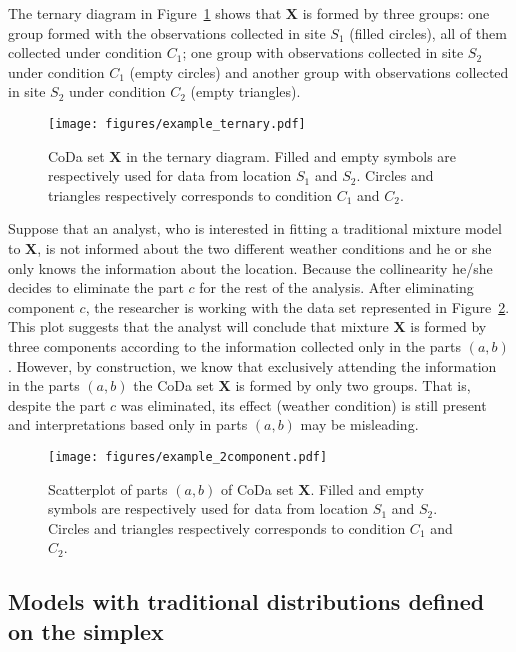 \documentclass[12pt, a4paper]{article}
\begin{document}
The ternary diagram in Figure~\ref{example_elim_component} shows that $\mathbf{X}$ is formed by three groups: one group formed with the observations collected in site $S_1$ (filled circles), all of them collected under condition $C_1$; one group with observations collected in site $S_2$ under condition $C_1$ (empty circles) and another group with observations collected in site $S_2$ under condition $C_2$ (empty triangles).
\begin{figure}[thbp]
\centering
\texttt{[image: figures/example\_ternary.pdf]}
\caption{CoDa set $\mathbf{X}$ in the ternary diagram. Filled and empty symbols are respectively used for
data from location $S_1$ and $S_2$. Circles and triangles respectively corresponds to condition
$C_1$ and $C_2$. }\label{example_elim_component}
\end{figure}
Suppose that an analyst, who is interested in fitting a traditional mixture model to $\mathbf{X}$, is not informed about the two different weather conditions and he or she only knows the information about the location. Because 
the collinearity he/she decides to eliminate the part $c$ for the rest of the analysis. After eliminating component $c$, the researcher is working with the data set represented in Figure~\ref{example_elim_2_components}. This plot suggests that the analyst will conclude that mixture $\mathbf{X}$ is formed by three components according to the information collected only in the parts $(a, b)$. However, by construction, we know that exclusively attending the information in the parts $(a, b)$ the CoDa set $\mathbf{X}$ is formed by only two groups. That is, despite the part $c$ was eliminated, its effect (weather condition) is still present and interpretations based only in parts $(a, b)$ may be misleading.
\begin{figure}[thbp]
\centering
\texttt{[image: figures/example\_2component.pdf]}
\caption{Scatterplot of parts $(a,b)$ of CoDa set $\mathbf{X}$. Filled and empty symbols are respectively used for
data from location $S_1$ and $S_2$. Circles and triangles respectively corresponds to condition
$C_1$ and $C_2$.}\label{example_elim_2_components}
\end{figure}

\subsection{Models with traditional distributions defined on the simplex}
\label{simplex_section}
\end{document}
